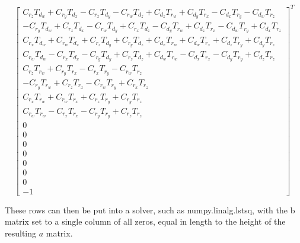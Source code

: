 \documentclass[12pt]{article}
\begin{document}
 \begin{equation}
     \begin{bmatrix}
     C_{r_z} T_{d_w}+C_{r_y} T_{d_x}-C_{r_x} T_{d_y}-C_{r_w} T_{d_z}+C_{d_z} T_{r_w}+C_{d_y} T_{r_x}-C_{d_x} T_{r_y}-C_{d_w} T_{r_z}\\
     -C_{r_y} T_{d_w}+C_{r_z} T_{d_x}-C_{r_w} T_{d_y}+C_{r_x} T_{d_z}-C_{d_y} T_{r_w}+C_{d_z} T_{r_x}-C_{d_w} T_{r_y}+C_{d_x} T_{r_z}\\
     C_{r_x} T_{d_w}+C_{r_w} T_{d_x}+C_{r_z} T_{d_y}+C_{r_y} T_{d_z}+C_{d_x} T_{r_w}+C_{d_w} T_{r_x}+C_{d_z} T_{r_y}+C_{d_y} T_{r_z}\\
     C_{r_w} T_{d_w}-C_{r_x} T_{d_x}-C_{r_y} T_{d_y}+C_{r_z} T_{d_z}+C_{d_w} T_{r_w}-C_{d_x} T_{r_x}-C_{d_y} T_{r_y}+C_{d_z} T_{r_z}\\
     C_{r_z} T_{r_w}+C_{r_y} T_{r_x}-C_{r_x} T_{r_y}-C_{r_w} T_{r_z}\\
     -C_{r_y} T_{r_w}+C_{r_z} T_{r_x}-C_{r_w} T_{r_y}+C_{r_x} T_{r_z}\\
     C_{r_x} T_{r_w}+C_{r_w} T_{r_x}+C_{r_z} T_{r_y}+C_{r_y} T_{r_z}\\
     C_{r_w} T_{r_w}-C_{r_x} T_{r_x}-C_{r_y} T_{r_y}+C_{r_z} T_{r_z}\\
     0 \\ 0 \\ 0 \\ 0 \\ 0 \\ 0 \\ 0 \\ -1
      \end{bmatrix}^T
  \end{equation}
  
  
These rows can then be put into a solver, such as numpy.linalg.lstsq, with the b matrix set to a single column of all zeros, equal in length to the height of the resulting $a$ matrix. 
\end{document}
